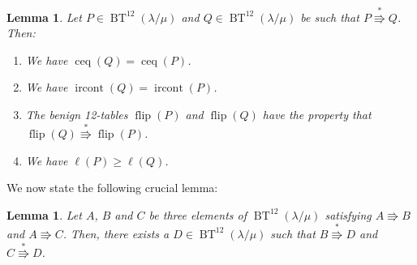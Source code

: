 \documentclass[12pt]{article}
\theoremstyle{plain}
\newtheorem{lemma}[theorem]{Lemma}
\theoremstyle{definition}
\newenvironment{proof}[1][Proof]{\noindent\textbf{#1.} }{\ \rule{0.5em}{0.5em}}
\def\BenignTables{{\operatorname{BT}^{12}\left(  \lambda/\mu\right)}}
\begin{document}
\begin{lemma}
\label{lem.descent-resolution-*props}Let $P\in\BenignTables$ and $Q\in\BenignTables$
be such that $P\overset{\ast}{\Rrightarrow}Q$. Then:

\begin{enumerate}

\item[\textbf{(a)}] We have $\operatorname*{ceq}\left(  Q\right)
=\operatorname*{ceq}\left(  P\right)  $.

\item[\textbf{(b)}] We have $\operatorname*{ircont}\left(  Q\right)
=\operatorname*{ircont}\left(  P\right)  $.

\item[\textbf{(c)}] The benign 12-tables $\operatorname*{flip}\left(  P\right)  $ and
$\operatorname*{flip}\left(  Q\right)  $ have the property that
$\operatorname*{flip}\left(  Q\right)  \overset{\ast}{\Rrightarrow
}\operatorname*{flip}\left(  P\right)  $.

\item[\textbf{(d)}] We have $\ell\left(  P\right)  \geq\ell\left(  Q\right)  $.

\end{enumerate}
\end{lemma}


We now state the following crucial lemma:

\begin{lemma}
\label{prop.descent-resolution-hyps}Let $A$, $B$ and $C$ be three elements of
$\BenignTables$ satisfying $A\Rrightarrow B$ and $A\Rrightarrow C$. Then, there
exists a $D\in\BenignTables$ such that $B\overset{\ast}{\Rrightarrow}D$ and
$C\overset{\ast}{\Rrightarrow}D$.
\end{lemma}
\end{document}
